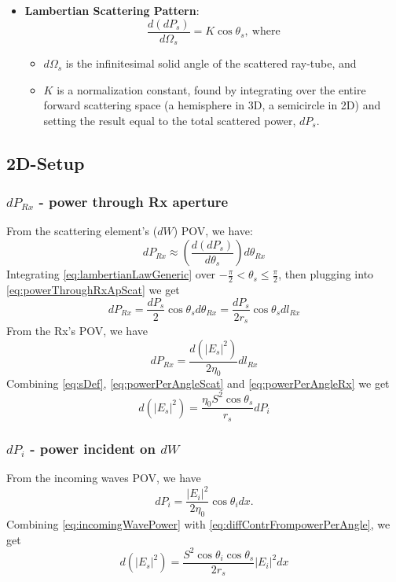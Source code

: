 \documentclass{article}
\begin{document}
\begin{itemize}
      \item \textbf{Lambertian Scattering Pattern}:
      \begin{equation}
         \frac{d(dP_s)}{d\Omega_s} = K \cos \theta_s, \ \text{where}
         \label{eq:lambertianLawGeneric}
      \end{equation}
      \begin{itemize}
         \item $d \Omega_s$ is the infinitesimal solid angle of the scattered
            ray-tube, and
         \item $K$ is a normalization constant, found by integrating over the entire
            forward scattering space (a hemisphere in 3D, a semicircle in 2D) and
            setting the result equal to the total scattered power, $dP_s$.
      \end{itemize}
\end{itemize}
\subsection*{2D-Setup}
\subsubsection*{$d P_{Rx}$ - power through Rx aperture}
From the scattering element's ($dW$) POV, we have:
\begin{equation}
   dP_{Rx} \approx \left( \frac{d (dP_s) }{d \theta_s} \right) d \theta_{Rx} \label{eq:powerThroughRxApScat}
\end{equation}
Integrating \eqref{eq:lambertianLawGeneric} over $-\frac{\pi}{2} < \theta_{s}
\leq \frac{\pi}{2}$, then plugging into \eqref{eq:powerThroughRxApScat} we get 
\begin{equation}
   dP_{Rx} = \frac{dP_{s}}{2} \cos \theta_s d \theta_{Rx} = \frac{dP_s}{2r_s}
   \cos \theta_s d l_{Rx}
   \label{eq:powerPerAngleScat}
\end{equation}
From the Rx's POV, we have
\begin{equation}
   dP_{Rx} = \frac{d(|E_s|^2)}{2 \eta_0} dl_{Rx}
   \label{eq:powerPerAngleRx}
\end{equation}
Combining \eqref{eq:sDef}, \eqref{eq:powerPerAngleScat} and \eqref{eq:powerPerAngleRx} we get 
\begin{equation}
   d(|E_s|^2) = \frac{\eta_0 S^2 \cos \theta_s}{r_s} dP_i
   \label{eq:diffContrFrompowerPerAngle}
\end{equation}
\subsubsection*{$dP_i$ - power incident on $dW$}
From the incoming waves POV, we have 
\begin{equation}
   dP_i = \frac{|E_i|^2}{2 \eta_0} \cos \theta_i dx.
   \label{eq:incomingWavePower}
\end{equation}
Combining \eqref{eq:incomingWavePower} with \eqref{eq:diffContrFrompowerPerAngle}, we get
\begin{equation}
   d(|E_s|^2) = \frac{S^2 \cos \theta_i \cos \theta_s}{2r_s} |E_i|^2 dx
   \label{eq:fieldPre}
\end{equation}
\end{document}
